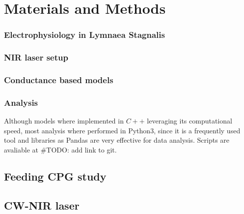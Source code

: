 \chapter{Materials and Methods}
\subsection{Electrophysiology in Lymnaea Stagnalis}

\subsection{NIR laser setup}
\subsection{Conductance based models}
\subsection{Analysis}
Although models where implemented in $C++$ leveraging its computational speed, most analysis where performed in Python3, since it is a frequently used tool and libraries as Pandas are very effective for data analysis. 
Scripts are avaliable at \#TODO: add link to git. 

\section{Feeding CPG study}

\section{CW-NIR laser}
